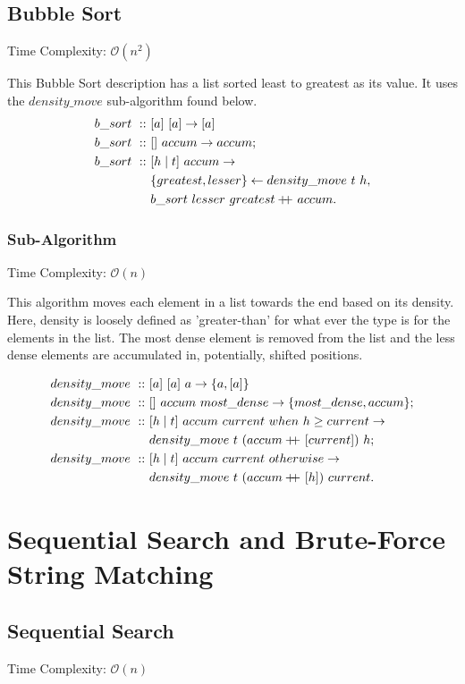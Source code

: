 \documentclass[a4paper,10pt]{book}
\newcommand\doubleplus{+\kern-1.3ex+\kern0.8ex}
\begin{document}
\subsection{Bubble Sort}Time Complexity: $\mathcal{O}(n^2)$

This Bubble Sort description has a list sorted least to greatest as its value. It uses the $density\_move$ sub-algorithm found below.
\begin{align*}
b\_sort\ ::\ &[a]\ [a]\rightarrow [a]\\
b\_sort\ ::\ &[]\ accum\rightarrow accum;\\
b\_sort\ ::\ &[h\mid t]\ accum\rightarrow\\
	&\{greatest, lesser\}\leftarrow density\_move\ t\ h,\\
	&b\_sort\ lesser\ greatest\doubleplus accum.
\end{align*}

\subsubsection{Sub-Algorithm}Time Complexity: $\mathcal{O}(n)$

This algorithm moves each element in a list towards the end based on its density. Here, density is loosely defined as 'greater-than' for what ever the type is for the elements in the list. The most dense element is removed from the list and the less dense elements are accumulated in, potentially, shifted positions.
 
\begin{align*}
density\_move\ ::\ &[a]\ [a]\ a\rightarrow \{a,[a]\}\\
density\_move\ ::\ &[]\ accum\ most\_dense\rightarrow \{most\_dense,accum\};\\
density\_move\ ::\ &[h\mid t]\ accum\ current\ when\ h\ge current\rightarrow\\
	&density\_move\ t\ ( accum\doubleplus [current])\ h;\\
density\_move\ ::\ &[h\mid t]\ accum\ current\ otherwise\rightarrow\\
	&density\_move\ t\ (accum\doubleplus[h])\ current.
\end{align*}
\section{Sequential Search and Brute-Force String Matching}
\subsection{Sequential Search}
Time Complexity: $\mathcal{O}(n)$
\end{document}

